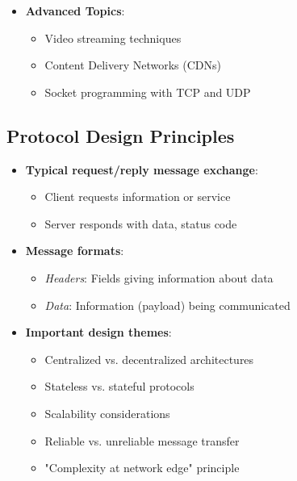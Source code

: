 \documentclass[12pt]{article}
\begin{document}
\begin{itemize}
    \item \textbf{Advanced Topics}:
          \begin{itemize}
              \item Video streaming techniques
              \item Content Delivery Networks (CDNs)
              \item Socket programming with TCP and UDP
          \end{itemize}
\end{itemize}

\subsection{Protocol Design Principles}

\begin{itemize}
    \item \textbf{Typical request/reply message exchange}:
          \begin{itemize}
              \item Client requests information or service
              \item Server responds with data, status code
          \end{itemize}

    \item \textbf{Message formats}:
          \begin{itemize}
              \item \textit{Headers}: Fields giving information about data
              \item \textit{Data}: Information (payload) being communicated
          \end{itemize}

    \item \textbf{Important design themes}:
          \begin{itemize}
              \item Centralized vs. decentralized architectures
              \item Stateless vs. stateful protocols
              \item Scalability considerations
              \item Reliable vs. unreliable message transfer
              \item "Complexity at network edge" principle
          \end{itemize}
\end{itemize}
\end{document}
